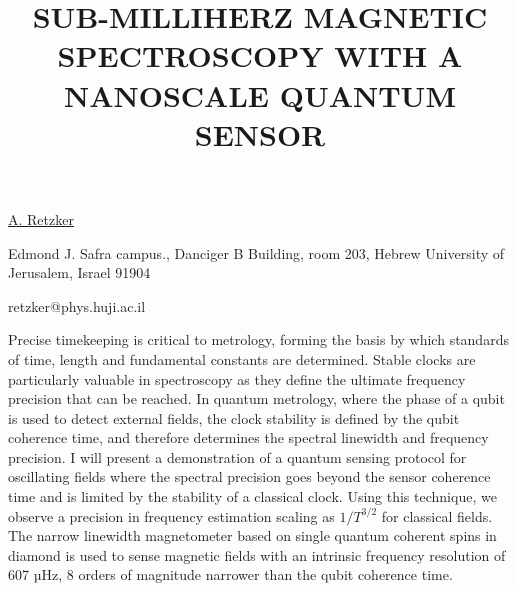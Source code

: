 \title{SUB-MILLIHERZ MAGNETIC SPECTROSCOPY WITH A NANOSCALE QUANTUM SENSOR}

\underline{A. Retzker} 

{\normalsize{\vspace{-4mm}
Edmond J. Safra campus.,
Danciger B Building, room 203,
Hebrew University of Jerusalem,
Israel 91904

\email retzker@phys.huji.ac.il}}

Precise timekeeping is critical to metrology, forming the basis by which standards of time, length and fundamental constants are determined. Stable clocks are particularly valuable in spectroscopy as they define the ultimate frequency precision that can be reached. In quantum metrology, where the phase of a qubit is used to detect external fields, the clock stability is defined by the qubit coherence time, and therefore determines the spectral linewidth and frequency precision. I will present a demonstration of a quantum sensing protocol for oscillating fields where the spectral precision goes beyond the sensor coherence time and is limited by the stability of a classical clock. Using this technique, we observe a precision in frequency estimation scaling as $1/T^{3/2}$ for classical fields. The narrow linewidth magnetometer based on single quantum coherent spins in diamond is used to sense magnetic fields with an intrinsic frequency resolution of 607 µHz, 8 orders of magnitude narrower than the qubit coherence time.

\vspace{\baselineskip} 